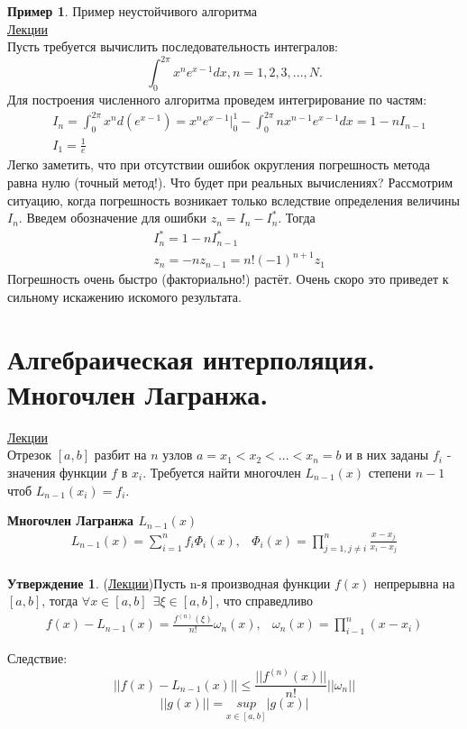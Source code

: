 \documentclass[specialist, subf, href, colorlinks=true, 12pt, times, mtpro, final]{disser}
\theoremstyle{definition}
\newtheorem{example}{Пример}[section]
\newtheorem{state}{Утверждение}[section]
\begin{document}
	\begin{example}
    	Пример неустойчивого алгоритма \\
    	\hyperlink {lects.14}{Лекции}\\
    	Пусть требуется вычислить последовательность интегралов:
    	$$
    	    \int_0^{2\pi}{x^n e^{x-1}dx}, n = 1,2,3,...,N.
    	$$
    	Для построения численного алгоритма проведем интегрирование по частям:
    	$$
    	\begin{aligned}
    	    & I_n = \int_0^{2\pi}{x^n d(e^{x-1})} = x^n e^{x-1} \big|_0^1 - \int_0^{2\pi}{n x^{n-1} e^{x-1}dx} = 1 - n 	I_{n-1} \\
        	& I_1 = \frac{1}{e}
    	\end{aligned}
    	$$
    	Легко заметить, что при отсутствии ошибок округления погрешность метода равна нулю (точный метод!). Что будет при реальных вычислениях? Рассмотрим ситуацию, когда погрешность возникает только вследствие определения величины $I_n$. Введем обозначение для ошибки $z_n = I_n - I_n^*$. Тогда
    	$$
    	\begin{aligned}
    	    & I_n^* = 1 - n I_{n-1}^* \\
        	& z_n = - n z_{n-1} = n! (-1)^{n+1} z_1
    	\end{aligned}
    	$$
    	Погрешность очень быстро (факториально!) растёт. Очень скоро это приведет к сильному искажению искомого результата.
	\end{example}

\section {Алгебраическая интерполяция. Многочлен Лагранжа.}
	\hyperlink {lects.15}{Лекции}\\
	Отрезок $[a,b]$ разбит на $n$ узлов $a = x_1 < x_2 < ... < x_n = b$ и в них заданы $f_i$ - значения функции $f$ в $x_i$. Требуется найти многочлен $L_{n-1}(x)$ степени $n - 1$ чтоб $L_{n - 1}(x_i) = f_i$.

	\textbf{Многочлен Лагранжа $L_{n - 1}(x)$}
	$$
		\begin {array}{lr}
		L_{n - 1}(x) = \sum\limits_{i = 1}^{n} f_i \Phi_i (x), & \Phi_i(x) = \prod\limits_{j = 1, j\ne i}^{n} \frac{x-x_j}{x_i - x_j} \\
		\end {array}
	$$

	\begin{state}
		(\hyperlink {lects.16}{Лекции})Пусть n-я производная функции $f(x)$ непрерывна на $[a,b]$, тогда $\forall x \in [a,b] \ \  \exists \xi \in [a,b]$, что справедливо
		$$
			\begin{array}{lr}
			f(x) - L_{n-1}(x) = \frac {f^{(n)}(\xi)}{n!} \omega_n(x), & \omega_n(x) = \prod\limits_{i - 1}^{n}(x-x_i)
			\end{array}
		$$
	\end{state}
	Следствие:
	$$
		||f(x) - L_{n-1}(x) || \le \frac{||f^{(n)}(x)||}{n!} ||\omega_n||
	$$
	$$
		||g(x)|| = \underset{x\in [a,b]}{sup} |g(x)|
	$$
\end{document}
